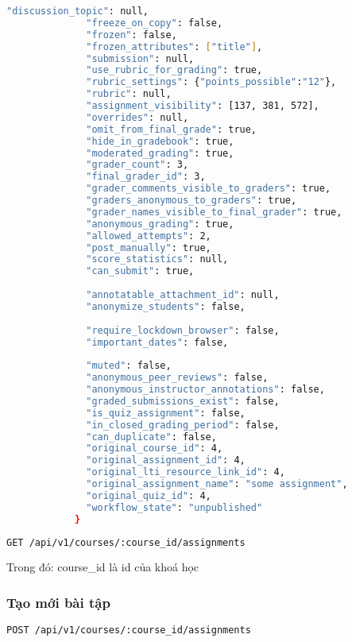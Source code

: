 \documentclass[../Thesis.tex]{subfiles}
\begin{document}
\begin{lstlisting}[language=bash]
              "discussion_topic": null,
              "freeze_on_copy": false,
              "frozen": false,
              "frozen_attributes": ["title"],
              "submission": null,
              "use_rubric_for_grading": true,
              "rubric_settings": {"points_possible":"12"},
              "rubric": null,
              "assignment_visibility": [137, 381, 572],
              "overrides": null,
              "omit_from_final_grade": true,
              "hide_in_gradebook": true,
              "moderated_grading": true,
              "grader_count": 3,
              "final_grader_id": 3,
              "grader_comments_visible_to_graders": true,
              "graders_anonymous_to_graders": true,
              "grader_names_visible_to_final_grader": true,
              "anonymous_grading": true,
              "allowed_attempts": 2,
              "post_manually": true,
              "score_statistics": null,
              "can_submit": true,
              
              "annotatable_attachment_id": null,
              "anonymize_students": false,
            
              "require_lockdown_browser": false,
              "important_dates": false,
             
              "muted": false,
              "anonymous_peer_reviews": false,
              "anonymous_instructor_annotations": false,
              "graded_submissions_exist": false,
              "is_quiz_assignment": false,
              "in_closed_grading_period": false,
              "can_duplicate": false,
              "original_course_id": 4,
              "original_assignment_id": 4,
              "original_lti_resource_link_id": 4,
              "original_assignment_name": "some assignment",
              "original_quiz_id": 4,
              "workflow_state": "unpublished"
            }
            \end{lstlisting}

          \begin{lstlisting}[language=bash]
            GET /api/v1/courses/:course_id/assignments
          \end{lstlisting}

          Trong đó: course\_id là id của khoá học

        \subsubsection{Tạo mới bài tập}
          \begin{lstlisting}[language=bash]
            POST /api/v1/courses/:course_id/assignments
          \end{lstlisting}
\end{document}
